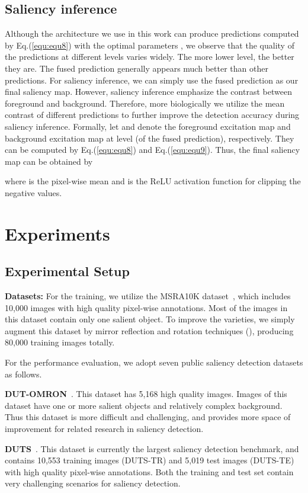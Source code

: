 \documentclass[10pt,twocolumn,letterpaper]{article}
\begin{document}
\subsection{Saliency inference}
Although the architecture we use in this work can produce  predictions computed by Eq.(\ref{equ:equ8}) with the optimal parameters , we observe that the quality of the predictions at different levels varies widely.
The more lower level, the better they are.
The fused prediction generally appears much better than other predictions.
For saliency inference, we can simply use the fused prediction as our final saliency map.
However, saliency inference emphasize the contrast between foreground and background.
Therefore, more biologically we utilize the mean contrast of different predictions to further improve the detection accuracy during saliency inference.
Formally, let  and  denote the foreground excitation map and background excitation map at level  (of the fused prediction), respectively.
They can be computed by Eq.(\ref{equ:equ8}) and Eq.(\ref{equ:equ9}).
Thus, the final saliency map can be obtained by

where  is the pixel-wise mean and  is the ReLU activation function for clipping the negative values.
\section{Experiments}
\subsection{Experimental Setup}
\textbf{Datasets:} For the training, we utilize the MSRA10K dataset~\cite{ChengPAMI}, which includes 10,000 images with high quality pixel-wise annotations.
Most of the images in this dataset contain only one salient object.
To improve the varieties, we simply augment this dataset by mirror reflection and rotation techniques (), producing 80,000 training images totally.


For the performance evaluation, we adopt seven public saliency detection datasets as follows.

\textbf{DUT-OMRON}~\cite{yang2013saliency}. This dataset has 5,168 high quality images. Images of this dataset have one or more salient objects and relatively complex background. Thus this dataset is more difficult and challenging, and provides more space of improvement for related research in saliency detection.

\textbf{DUTS}~\cite{zhao2015saliency}. This dataset is currently the largest saliency detection benchmark, and contains 10,553 training images (DUTS-TR) and 5,019 test images (DUTS-TE) with high quality pixel-wise annotations.
Both the training and test set contain very challenging scenarios for saliency detection.
\end{document}
